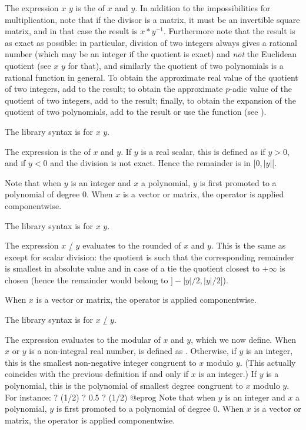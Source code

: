 \subseckbd{/} The expression $x$ \kbd{/} $y$ is the  of $x$
and $y$. In addition to the impossibilities for multiplication, note that if
the divisor is a matrix, it must be an invertible square matrix, and in that
case the result is $x*y^{-1}$. Furthermore note that the result is as exact
as possible: in particular, division of two integers always gives a rational
number (which may be an integer if the quotient is exact) and \emph{not} the
Euclidean quotient (see $x$ \kbd{\bs} $y$ for that), and similarly the
quotient of two polynomials is a rational function in general. To obtain the
approximate real value of the quotient of two integers, add  to the
result; to obtain the approximate $p$-adic value of the quotient of two
integers, add  to the result; finally, to obtain the
 expansion of the quotient of two polynomials, add
 to the result or use the  function
(see ). \label{se:gdiv}

The library syntax is  for $x$ \kbd{/} $y$.

\subseckbd{\bs} The expression  is the  of $x$ and $y$. If $y$ is a real scalar, this is defined as
 if $y > 0$, and  if $y < 0$ and
the division is not exact. Hence the remainder 
is in $[0, |y|[$.

Note that when $y$ is an integer and $x$ a polynomial, $y$ is first promoted
to a polynomial of degree $0$. When $x$ is a vector or matrix, the operator
is applied componentwise.

The library syntax is 
for $x$ \kbd{\bs} $y$.

\subseckbd{\bs/} The expression $x$ \b{/} $y$ evaluates to the rounded
 of $x$ and $y$. This is the same as 
except for scalar division: the quotient is such that the corresponding
remainder is smallest in absolute value and in case of a tie the quotient
closest to $+\infty$ is chosen (hence the remainder would belong to
$]{-}|y|/2, |y|/2]$).

When $x$ is a vector or matrix, the operator is applied componentwise.

The library syntax is 
for $x$ \b{/} $y$.

\subseckbd{\%} The expression  evaluates to the modular
 of $x$ and $y$, which we now define. When $x$ or $y$
is a non-integral real number,  is defined as . Otherwise, if $y$ is an integer, this is the smallest
non-negative integer congruent to $x$ modulo $y$. (This actually coincides with
the previous definition if and only if $x$ is an integer.) If $y$ is a
polynomial, this is the polynomial of smallest degree congruent to $x$ modulo
$y$. For instance:
\bprog
? (1/2) %
? 0.5 %
? (1/2) %
@eprog
Note that when $y$ is an integer and $x$ a polynomial, $y$ is first promoted
to a polynomial of degree $0$. When $x$ is a vector or matrix, the operator
is applied componentwise.

